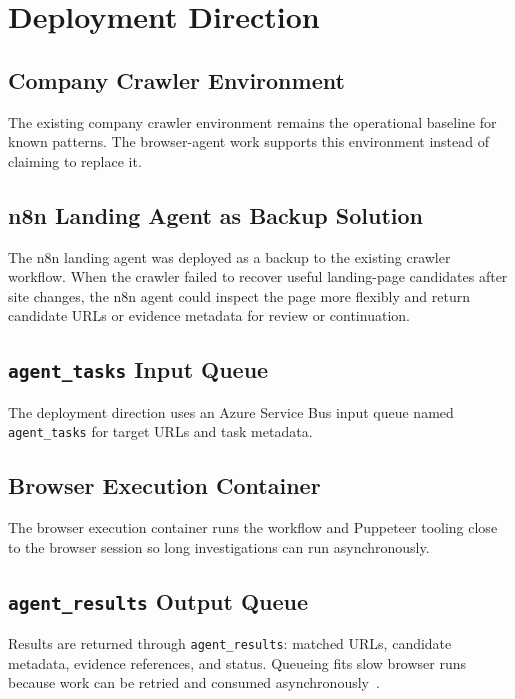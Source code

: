 \section{Deployment Direction}

\subsection{Company Crawler Environment}

The existing company crawler environment remains the operational baseline for
known patterns. The browser-agent work supports this environment instead of
claiming to replace it.

\subsection{n8n Landing Agent as Backup Solution}

The n8n landing agent was deployed as a backup to the existing crawler
workflow. When the crawler failed to recover useful landing-page candidates
after site changes, the n8n agent could inspect the page more flexibly and
return candidate URLs or evidence metadata for review or continuation.

\subsection{\texttt{agent\_tasks} Input Queue}

The deployment direction uses an Azure Service Bus input queue named
\texttt{agent\_tasks} for target URLs and task metadata.

\subsection{Browser Execution Container}

The browser execution container runs the workflow and Puppeteer tooling close
to the browser session so long investigations can run asynchronously.

\subsection{\texttt{agent\_results} Output Queue}

Results are returned through \texttt{agent\_results}: matched URLs, candidate
metadata, evidence references, and status. Queueing fits slow browser runs
because work can be retried and consumed asynchronously~\cite{azure-servicebus}.

